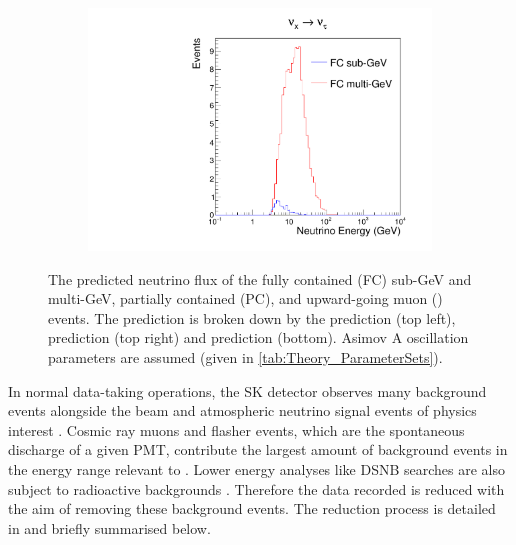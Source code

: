 \begin{figure}[h]
\begin{subfigure}[t]{0.49\textwidth}
    \includegraphics[width=\textwidth, trim={0mm 0mm 0mm 0mm}, clip,page=1]{Figures/Simulations/NeutrinoEnergyDist_NuTau.pdf}
  \end{subfigure}%
  \caption{The predicted neutrino flux of the fully contained (FC) sub-GeV and multi-GeV, partially contained (PC), and upward-going muon () events. The prediction is broken down by the  prediction (top left),  prediction (top right) and  prediction (bottom). Asimov A oscillation parameters are assumed (given in \autoref{tab:Theory_ParameterSets}).}
  \label{fig:Simulations_NeutrinoEnergyDistribution}
\end{figure}

In normal data-taking operations, the SK detector observes many background events alongside the beam and atmospheric neutrino signal events of physics interest . Cosmic ray muons and flasher events, which are the spontaneous discharge of a given PMT, contribute the largest amount of background events in the energy range relevant to  . Lower energy analyses like DSNB searches are also subject to radioactive backgrounds \cite{Nakano_2017}. Therefore the data recorded is reduced with the aim of removing these background events. The reduction process is detailed in \cite{Ashie_2005, Jiang2019-iw} and briefly summarised below.


